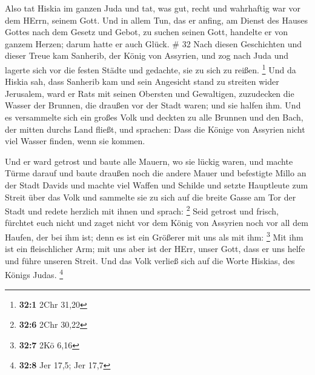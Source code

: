  Also tat Hiskia im ganzen Juda und tat, was gut, recht und
wahrhaftig war vor dem HErrn, seinem Gott.  Und in allem
Tun, das er anfing, am Dienst des Hauses Gottes nach dem Gesetz und
Gebot, zu suchen seinen Gott, handelte er von ganzem Herzen; darum hatte
er auch Glück. \# 32  Nach diesen Geschichten und dieser
Treue kam Sanherib, der König von Assyrien, und zog nach Juda und
lagerte sich vor die festen Städte und gedachte, sie zu sich zu reißen.
\footnote{\textbf{32:1} 2Chr 31,20}  Und da Hiskia sah, dass
Sanherib kam und sein Angesicht stand zu streiten wider Jerusalem,
 ward er Rats mit seinen Obersten und Gewaltigen, zuzudecken
die Wasser der Brunnen, die draußen vor der Stadt waren; und sie halfen
ihm.  Und es versammelte sich ein großes Volk und deckten zu
alle Brunnen und den Bach, der mitten durchs Land fließt, und sprachen:
Dass die Könige von Assyrien nicht viel Wasser finden, wenn sie kommen.

 Und er ward getrost und baute alle Mauern, wo sie lückig
waren, und machte Türme darauf und baute draußen noch die andere Mauer
und befestigte Millo an der Stadt Davids und machte viel Waffen und
Schilde  und setzte Hauptleute zum Streit über das Volk und
sammelte sie zu sich auf die breite Gasse am Tor der Stadt und redete
herzlich mit ihnen und sprach: \footnote{\textbf{32:6} 2Chr 30,22}
 Seid getrost und frisch, fürchtet euch nicht und zaget
nicht vor dem König von Assyrien noch vor all dem Haufen, der bei ihm
ist; denn es ist ein Größerer mit uns als mit ihm: \footnote{\textbf{32:7}
  2Kö 6,16}  Mit ihm ist ein fleischlicher Arm; mit uns aber
ist der HErr, unser Gott, dass er uns helfe und führe unseren Streit.
Und das Volk verließ sich auf die Worte Hiskias, des Königs Judas.
\footnote{\textbf{32:8} Jer 17,5; Jer 17,7}

